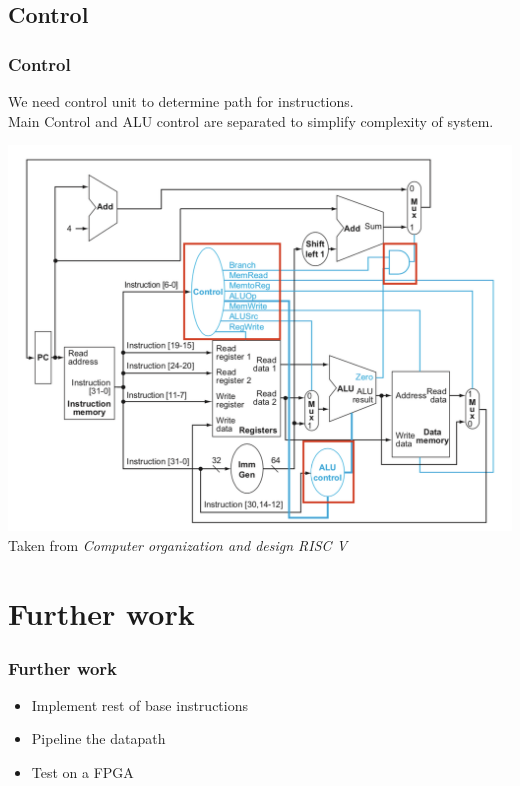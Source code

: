 \documentclass{beamer}
\begin{document}
    \begin{frame}
        \subsection{Control}
        \frametitle{Control}
        \centering
        \vspace{-0.5cm}
        We need control unit to determine path for instructions.\\ 
        Main Control and ALU control are separated to simplify complexity of system. 
        
        \includegraphics[scale=0.3]{"Pictures and plots/control"} \\
        \scriptsize{Taken from \textit{Computer organization and design RISC V}}
        
    \end{frame}

    
    \section{Further work}
    
    \begin{frame}
        \frametitle{Further work}
        \begin{itemize}
            \item Implement rest of base instructions
            \item Pipeline the datapath
            \item Test on a FPGA
        \end{itemize}   
    \end{frame}
	
\end{document}
